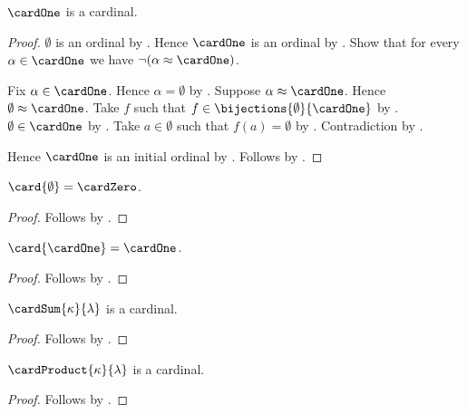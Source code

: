 \begin{proposition}\label{cardinal_one_is_cardinal}
    $\cardOne$ is a cardinal.
\end{proposition}
\begin{proof}
    $\emptyset$ is an ordinal by .
    Hence $\cardOne$ is an ordinal
        by .
    Show that for every $\alpha\in\cardOne$ we have
        $\lnot(\alpha\approx\cardOne)$.
    \begin{subproof}
        Fix $\alpha\in\cardOne$.
        Hence $\alpha=\emptyset$ by
            .
        Suppose $\alpha\approx\cardOne$.
        Hence $\emptyset\approx\cardOne$.
        Take $f$ such that $f\in\bijections{\emptyset}{\cardOne}$
            by .
        $\emptyset\in\cardOne$
            by .
        Take $a\in\emptyset$ such that $f(a)=\emptyset$
            by .
        Contradiction by .
    \end{subproof}
    Hence $\cardOne$ is an initial ordinal by .
    Follows by .
\end{proof}

\begin{proposition}\label{card_of_cardinal_zero}
    $\card{\emptyset}=\cardZero$.
\end{proposition}
\begin{proof}
    Follows by .
\end{proof}

\begin{proposition}\label{card_of_cardinal_one}
    $\card{\cardOne}=\cardOne$.
\end{proposition}
\begin{proof}
    Follows by .
\end{proof}

\begin{proposition}\label{cardinal_sum_is_cardinal}
    $\cardSum{\kappa}{\lambda}$ is a cardinal.
\end{proposition}
\begin{proof}
    Follows by .
\end{proof}

\begin{proposition}\label{cardinal_product_is_cardinal}
    $\cardProduct{\kappa}{\lambda}$ is a cardinal.
\end{proposition}
\begin{proof}
    Follows by .
\end{proof}


